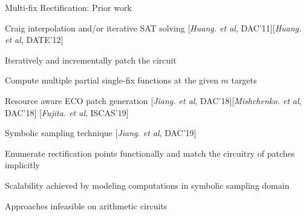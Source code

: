 \begin{frame}{\large Multi-fix Rectification: Prior work}

% 
\bi
\item Craig interpolation and/or iterative SAT solving [{\it Huang. et al}, DAC'11][{\it Huang. et al}, DATE'12]
\bi
	\item Iteratively and incrementally patch the circuit
	\item Compute multiple partial single-fix functions at the given $m$ targets
\ei
\item Resource aware ECO patch generation [{\it Jiang. et al}, DAC'18][{\it Mishchenko. et al}, DAC'18]
		[{\it Fujita. et al}, ISCAS'19]
\item Symbolic sampling technique [{\it Jiang. et al}, DAC'19]
\bi
	\item Enumerate rectification points functionally and match the circuitry of patches implicitly
	\item Scalability achieved by modeling computations in symbolic sampling domain
\ei
\pause
\vspace{0.1in}
\item Approaches infeasible on arithmetic circuits

\ei
\end{frame}


